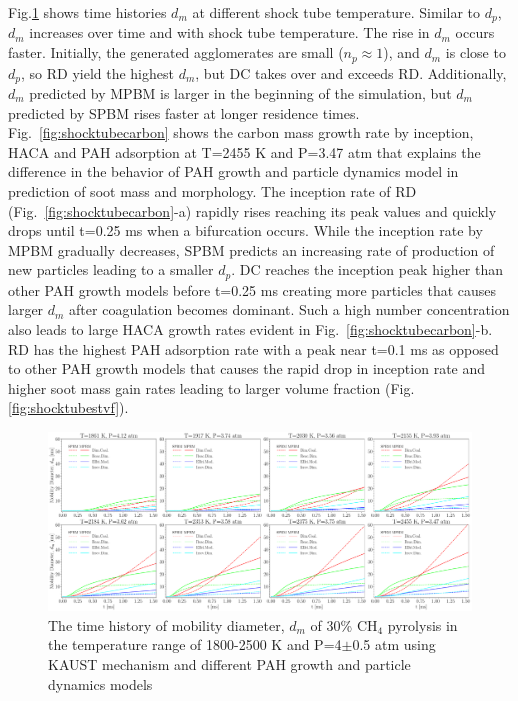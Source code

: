 Fig.\ref{fig:shocktubestcasedm} shows time histories $d_m$ at different shock tube temperature. Similar to $d_p$, $d_m$ increases over time and with shock tube temperature. The rise in $d_m$ occurs faster. Initially, the generated agglomerates are small ($n_p\approx1$), and $d_m$ is close to $d_p$, so RD yield the highest $d_m$, but DC takes over and exceeds RD. Additionally, $d_m$ predicted by MPBM is larger in the beginning of the simulation, but $d_m$ predicted by SPBM rises faster at longer residence times. Fig.~\ref{fig:shocktubecarbon} shows the carbon mass growth rate by inception, HACA and PAH adsorption at T=2455 K and P=3.47 atm that explains the difference in the behavior of PAH growth and particle dynamics model in prediction of soot mass and morphology. The inception rate of RD (Fig.~\ref{fig:shocktubecarbon}-a) rapidly rises reaching its peak values and quickly drops until t=0.25 ms when a bifurcation occurs. While the inception rate by MPBM gradually decreases, SPBM predicts an increasing rate of production of new particles leading to a smaller $d_p$. DC reaches the inception peak higher than other PAH growth models before t=0.25 ms creating more particles that causes larger $d_m$ after coagulation becomes dominant. Such a high number concentration also leads to large HACA growth rates evident in Fig.~\ref{fig:shocktubecarbon}-b. RD has the highest PAH adsorption rate with a peak near t=0.1 ms as opposed to other PAH growth models that causes the rapid drop in inception rate and higher soot mass gain rates leading to larger volume fraction (Fig.\ref{fig:shocktubestvf}).

\begin{figure}[H]
	\centering
	\includegraphics[width=1\textwidth]{Figures/Results/Shocktube/Stanford/june/stsh_cases_dm.pdf}
	\caption{The time history of mobility diameter, $d_m$ of 30\% $\mathrm{CH_4}$ pyrolysis in the temperature range of 1800-2500 K and P=4$\pm$0.5 atm using KAUST mechanism and different PAH growth and particle dynamics models}
	\label{fig:shocktubestcasedm} 
\end{figure}

